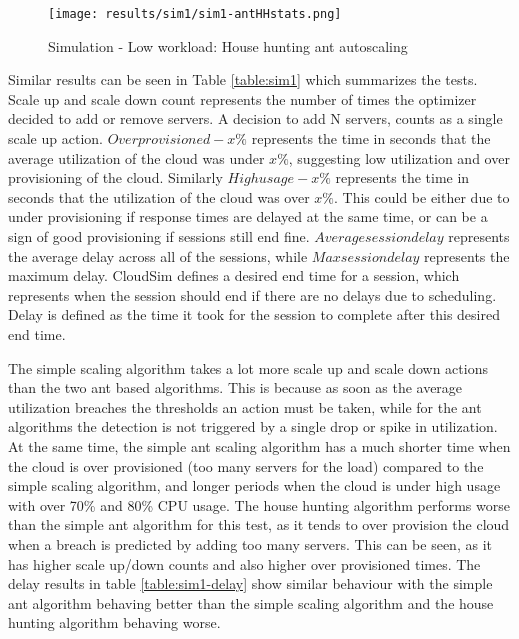 \documentclass[conference]{IEEEtran}
\begin{document}
\begin{figure}
	\centering
		\texttt{[image: results/sim1/sim1-antHHstats.png]}
	\caption{Simulation - Low workload: House hunting ant autoscaling}
	\label{fig:sim1-antHHstats}
\end{figure}

Similar results can be seen in Table \ref{table:sim1} which summarizes the tests. Scale up and scale down count represents the number of times the optimizer decided to add or remove servers. A decision to add N servers, counts as a single scale up action. $Over provisioned - x\%$ represents the time in seconds that the average utilization of the cloud was under $x\%$, suggesting low utilization and over provisioning of the cloud. Similarly $High usage - x\%$ represents the time in seconds that the utilization of the cloud was over $x\%$. This could be either due to under provisioning if response times are delayed at the same time, or can be a sign of good provisioning if sessions still end fine. $Average session delay$ represents the average delay across all of the sessions, while $Max session delay$ represents the maximum delay. CloudSim defines a desired end time for a session, which represents when the session should end if there are no delays due to scheduling. Delay is defined as the time it took for the session to complete after this desired end time.

The simple scaling algorithm takes a lot more scale up and scale down actions than the two ant based algorithms. This is because as soon as the average utilization breaches the thresholds an action must be taken, while for the ant algorithms the detection is not triggered by a single drop or spike in utilization. At the same time, the simple ant scaling algorithm has a much shorter time when the cloud is over provisioned (too many servers for the load) compared to the simple scaling algorithm, and longer periods when the cloud is under high usage with over 70\% and 80\% CPU usage. The house hunting algorithm performs worse than the simple ant algorithm for this test, as it tends to over provision the cloud when a breach is predicted by adding too many servers. This can be seen, as it has higher scale up/down counts and also higher over provisioned times. The delay results in table \ref{table:sim1-delay} show similar behaviour with the simple ant algorithm behaving better than the simple scaling algorithm and the house hunting algorithm behaving worse.
\end{document}
